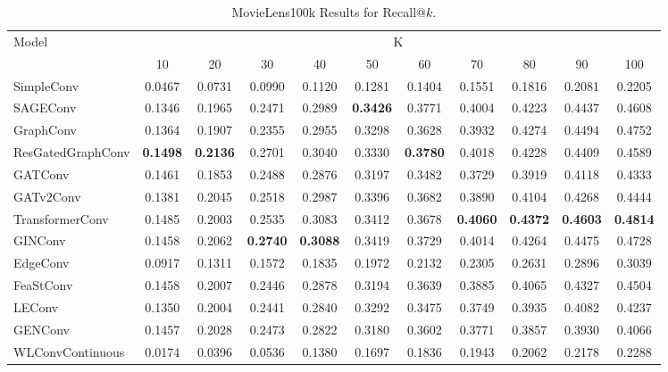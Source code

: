 \documentclass[bst/sn-nature]{sn-jnl}
\begin{document}
\begin{appendices}
\begin{table}[htbp]
    \centering 
    \begin{tabular}{|l|*{10}{c|}}
    \hline
    \multirow{2}{*}{Model} & \multicolumn{10}{c|}{K} \\
    \hhline{~*{10}{|-}|}
                             & 10    & 20    & 30    & 40    & 50    & 60    & 70    & 80    & 90    & 100   \\ \hline
    \rowcolor[gray]{0.9} SimpleConv               & 0.0467 & 0.0731 & 0.0990 & 0.1120 & 0.1281 & 0.1404 & 0.1551 & 0.1816 & 0.2081 & 0.2205 \\ 
    SAGEConv                 & 0.1346 & 0.1965 & 0.2471 & 0.2989 & \textbf{0.3426} & 0.3771 & 0.4004 & 0.4223 & 0.4437 & 0.4608 \\ 
    \rowcolor[gray]{0.9} GraphConv                & 0.1364 & 0.1907 & 0.2355 & 0.2955 & 0.3298 & 0.3628 & 0.3932 & 0.4274 & 0.4494 & 0.4752 \\ 
    ResGatedGraphConv        & \textbf{0.1498} & \textbf{0.2136} & 0.2701 & 0.3040 & 0.3330 & \textbf{0.3780} & 0.4018 & 0.4228 & 0.4409 & 0.4589 \\ 
    \rowcolor[gray]{0.9} GATConv                  & 0.1461 & 0.1853 & 0.2488 & 0.2876 & 0.3197 & 0.3482 & 0.3729 & 0.3919 & 0.4118 & 0.4333 \\ 
    GATv2Conv                & 0.1381 & 0.2045 & 0.2518 & 0.2987 & 0.3396 & 0.3682 & 0.3890 & 0.4104 & 0.4268 & 0.4444 \\ 
    \rowcolor[gray]{0.9} TransformerConv          & 0.1485 & 0.2003 & 0.2535 & 0.3083 & 0.3412 & 0.3678 & \textbf{0.4060} & \textbf{0.4372} & \textbf{0.4603} & \textbf{0.4814} \\ 
    GINConv                  & 0.1458 & 0.2062 & \textbf{0.2740} & \textbf{0.3088} & 0.3419 & 0.3729 & 0.4014 & 0.4264 & 0.4475 & 0.4728 \\ 
    \rowcolor[gray]{0.9} EdgeConv                 & 0.0917 & 0.1311 & 0.1572 & 0.1835 & 0.1972 & 0.2132 & 0.2305 & 0.2631 & 0.2896 & 0.3039 \\ 
    FeaStConv                & 0.1458 & 0.2007 & 0.2446 & 0.2878 & 0.3194 & 0.3639 & 0.3885 & 0.4065 & 0.4327 & 0.4504 \\ 
    \rowcolor[gray]{0.9} LEConv                   & 0.1350 & 0.2004 & 0.2441 & 0.2840 & 0.3292 & 0.3475 & 0.3749 & 0.3935 & 0.4082 & 0.4237 \\ 
    GENConv                  & 0.1457 & 0.2028 & 0.2473 & 0.2822 & 0.3180 & 0.3602 & 0.3771 & 0.3857 & 0.3930 & 0.4066 \\ 
    \rowcolor[gray]{0.9} WLConvContinuous         & 0.0174 & 0.0396 & 0.0536 & 0.1380 & 0.1697 & 0.1836 & 0.1943 & 0.2062 & 0.2178 & 0.2288 \\ \hline
    \end{tabular}
    \caption{MovieLens100k Results for Recall@$k$.}
    \label{tab:recall}
\end{table}


\end{appendices}
\end{document}
